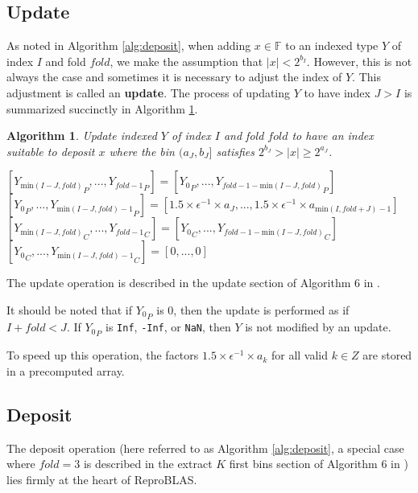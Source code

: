 \documentclass[12pt]{article}
\providecommand{\F}{\ensuremath{\mathbb{F}}}
\providecommand{\min}{\ensuremath{\text{min}}}
\theoremstyle{plain}
\newtheorem{alg}{Algorithm}[section]
\numberwithin{equation}{section}
\begin{document}
  \subsection{Update}
    As noted in Algorithm \ref{alg:deposit}, when adding $x \in \F$ to an indexed type $Y$ of index $I$ and fold $fold$, we make the assumption that $|x| < 2^{b_I}$. However, this is not always the case and sometimes it is necessary to adjust the index of $Y$. This adjustment is called an \textbf{update}. The process of updating $Y$ to have index $J > I$ is summarized succinctly in Algorithm \ref{alg:update}.
    \begin{alg}
      Update indexed $Y$ of index $I$ and fold $fold$ to have an index suitable to deposit $x$ where the bin $(a_{J}, b_{J}]$ satisfies $2^{b_{J}} > |x| \geq 2^{a_{J}}$.
      \begin{algorithmic}[1]
            \State $[{Y_{\min(I - J, fold)}}_P, ..., {Y_{fold - 1}}_P] = [{Y_0}_P, ..., {Y_{fold - 1 - \min(I - J, fold)}}_P]$
            \State $[{Y_0}_P, ..., {Y_{\min(I - J, fold) - 1}}_P] = [1.5 \times \epsilon^{-1} \times a_{J}, ..., 1.5 \times \epsilon^{-1} \times a_{\min(I, fold + J) - 1}]$
            \State $[{Y_{\min(I - J, fold)}}_C, ..., {Y_{fold - 1}}_C] = [{Y_0}_C, ..., {Y_{fold - 1 - \min(I - J, fold)}}_C]$
            \State $[{Y_0}_C, ..., {Y_{\min(I - J, fold) - 1}}_C] = [0, ..., 0]$
          \EndIf
        \EndFunction
      \end{algorithmic}
      \label{alg:update}
    \end{alg}
    The update operation is described in the update section of Algorithm $6$ in \cite{repsum}.

    It should be noted that if ${Y_0}_P$ is 0, then the update is performed as if $I + fold < J$. If ${Y_0}_P$ is \verb|Inf|, \verb|-Inf|, or \verb|NaN|, then $Y$ is not modified by an update.

    To speed up this operation, the factors $1.5 \times \epsilon^{-1} \times a_k$ for all valid $k \in Z$ are stored in a precomputed array.

  \subsection{Deposit}
    The deposit operation (here referred to as Algorithm \ref{alg:deposit}, a special case where $fold = 3$ is described in the extract $K$ first bins section of Algorithm $6$ in \cite{repsum}) lies firmly at the heart of ReproBLAS.
\end{document}

